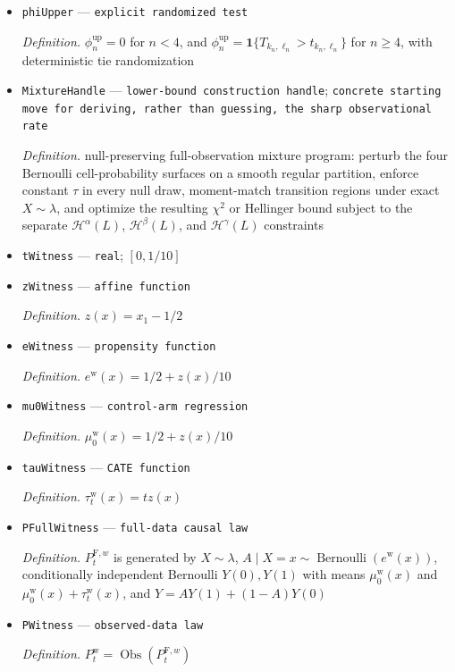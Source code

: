 \documentclass{article}
\begin{document}
\begin{itemize}
  \item \texttt{phiUpper} --- \texttt{explicit randomized test}
  \par\smallskip\noindent\emph{Definition.} \(\phi_n^{\mathrm{up}}=0\) for \(n<4\), and \(\phi_n^{\mathrm{up}}=\mathbf 1\{T_{k_n,\ell_n}>t_{k_n,\ell_n}\}\) for \(n\ge4\), with deterministic tie randomization
  \item \texttt{MixtureHandle} --- \texttt{lower-\allowbreak{}bound construction handle}; \texttt{concrete starting move for deriving,\allowbreak{} rather than guessing,\allowbreak{} the sharp observational rate}
  \par\smallskip\noindent\emph{Definition.} null-preserving full-observation mixture program: perturb the four Bernoulli cell-probability surfaces on a smooth regular partition, enforce constant \(\tau\) in every null draw, moment-match transition regions under exact \(X\sim\lambda\), and optimize the resulting \(\chi^2\) or Hellinger bound subject to the separate \(\mathcal H^\alpha(L)\), \(\mathcal H^\beta(L)\), and \(\mathcal H^\gamma(L)\) constraints
  \item \texttt{tWitness} --- \texttt{real}; \([0,1/10]\)
  \item \texttt{zWitness} --- \texttt{affine function}
  \par\smallskip\noindent\emph{Definition.} \(z(x)=x_1-1/2\)
  \item \texttt{eWitness} --- \texttt{propensity function}
  \par\smallskip\noindent\emph{Definition.} \(e^{\mathrm w}(x)=1/2+z(x)/10\)
  \item \texttt{mu0Witness} --- \texttt{control-\allowbreak{}arm regression}
  \par\smallskip\noindent\emph{Definition.} \(\mu_0^{\mathrm w}(x)=1/2+z(x)/10\)
  \item \texttt{tauWitness} --- \texttt{CATE function}
  \par\smallskip\noindent\emph{Definition.} \(\tau_t^{\mathrm w}(x)=t z(x)\)
  \item \texttt{PFullWitness} --- \texttt{full-\allowbreak{}data causal law}
  \par\smallskip\noindent\emph{Definition.} \(P_t^{\mathrm F,w}\) is generated by \(X\sim\lambda\), \(A\mid X=x\sim\operatorname{Bernoulli}(e^{\mathrm w}(x))\), conditionally independent Bernoulli \(Y(0),Y(1)\) with means \(\mu_0^{\mathrm w}(x)\) and \(\mu_0^{\mathrm w}(x)+\tau_t^{\mathrm w}(x)\), and \(Y=AY(1)+(1-A)Y(0)\)
  \item \texttt{PWitness} --- \texttt{observed-\allowbreak{}data law}
  \par\smallskip\noindent\emph{Definition.} \(P_t^{\mathrm w}=\operatorname{Obs}(P_t^{\mathrm F,w})\)
\end{itemize}
\end{document}
